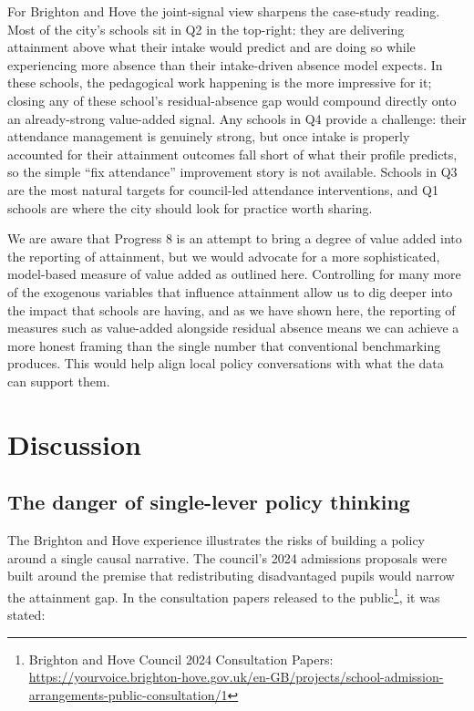\documentclass[
  12pt,
  titlepage]{article}
\begin{document}
For Brighton and Hove the joint-signal view sharpens the case-study
reading. Most of the city's schools sit in Q2 in the top-right: they are
delivering attainment above what their intake would predict and are
doing so while experiencing more absence than their intake-driven
absence model expects. In these schools, the pedagogical work happening
is the more impressive for it; closing any of these school's
residual-absence gap would compound directly onto an already-strong
value-added signal. Any schools in Q4 provide a challenge: their
attendance management is genuinely strong, but once intake is properly
accounted for their attainment outcomes fall short of what their profile
predicts, so the simple ``fix attendance'' improvement story is not
available. Schools in Q3 are the most natural targets for council-led
attendance interventions, and Q1 schools are where the city should look
for practice worth sharing.

We are aware that Progress 8 is an attempt to bring a degree of value
added into the reporting of attainment, but we would advocate for a more
sophisticated, model-based measure of value added as outlined here.
Controlling for many more of the exogenous variables that influence
attainment allow us to dig deeper into the impact that schools are
having, and as we have shown here, the reporting of measures such as
value-added alongside residual absence means we can achieve a more
honest framing than the single number that conventional benchmarking
produces. This would help align local policy conversations with what the
data can support them.

\section{Discussion}\label{discussion}

\subsection{The danger of single-lever policy
thinking}\label{the-danger-of-single-lever-policy-thinking}

The Brighton and Hove experience illustrates the risks of building a
policy around a single causal narrative. The council's 2024 admissions
proposals were built around the premise that redistributing
disadvantaged pupils would narrow the attainment gap. In the
consultation papers released to the public\footnote{Brighton and Hove
  Council 2024 Consultation Papers:
  \url{https://yourvoice.brighton-hove.gov.uk/en-GB/projects/school-admission-arrangements-public-consultation/1}},
it was stated:
\end{document}
